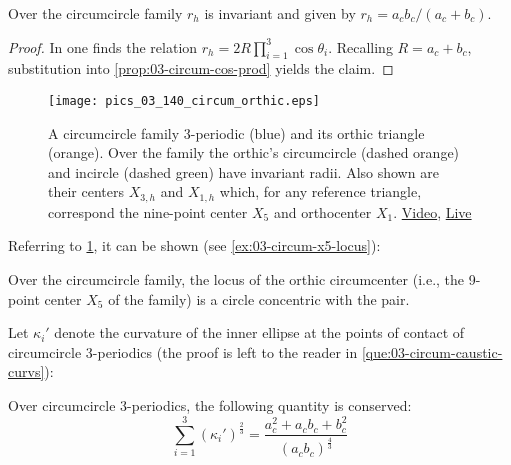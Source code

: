 
\begin{proposition}
Over the circumcircle family  $r_h$ is invariant and  given by $r_h=a_c b_c/(a_c+b_c)$. 
\label{prop:03-circumcircle-rh}
\end{proposition}

\begin{proof}
In \cite[Orthic Triangle, Eqn. 5]{mw} one finds the relation  $r_h=2 R \prod_{i=1}^3{\cos\theta_i}$. Recalling $R=a_c+b_c$, substitution into \cref{prop:03-circum-cos-prod} yields the claim.
\end{proof}

\begin{figure}
    \centering
    \texttt{[image: pics\_03\_140\_circum\_orthic.eps]}
    \caption{A circumcircle family 3-periodic (blue) and its orthic triangle (orange). Over the family the orthic's circumcircle (dashed orange) and incircle (dashed green) have invariant radii. Also shown are their centers $X_{3,h}$ and $X_{1,h}$ which, for any reference triangle, correspond the nine-point center $X_5$ and orthocenter $X_1$. \href{https://youtu.be/wUu2iMesv3U}{Video}, \href{https://bit.ly/2PHJZma}{Live}}
    \label{fig:03-circum-orthic}
\end{figure}


Referring to  \cref{fig:03-circum-orthic}, it can be shown (see \cref{ex:03-circum-x5-locus}):

\begin{lemma}
Over the circumcircle family, the locus of the orthic circumcenter (i.e., the 9-point center $X_5$ of the family) is a circle concentric with the pair.
\label{lem:03-circum-x5-locus}
\end{lemma}


Let $\kappa_i'$ denote the curvature of the inner ellipse at the points of contact of circumcircle 3-periodics (the proof is left to the reader in \cref{que:03-circum-caustic-curvs}):

\begin{proposition}
Over circumcircle 3-periodics, the following quantity is conserved:
\[ \sum_{i=1}^3 (\kappa_i')^{\frac{2}{3}} =
\frac{ a_c^2 + a_c b_c + b_c^2 }{(a_c b_c)^{\frac{4}{3}}  }
  \]
\label{prop:03-circum-caustic-curvs}
\end{proposition}

